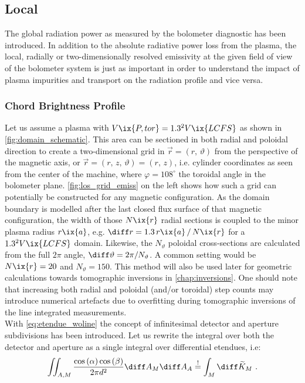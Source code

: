         \subsection{Local}\label{subsec:local}%
%
            The global radiation power as measured by the bolometer diagnostic has been introduced. In addition to the absolute radiative power loss from the plasma, the local, radially or two-dimensionally resolved emissivity at the given field of view of the bolometer system is just as important in order to understand the impact of plasma impurities and transport on the radiation profile and vice versa.%
%
            \subsubsection*{Chord Brightness Profile}%
%
                Let us assume a plasma with $V\ix{P, tor}=1.3^{2}V\ix{LCFS}$ as shown in \cref{fig:domain_schematic}. This area can be sectioned in both radial and poloidal direction to create a two-dimensional grid in $\vec{r}=\left(r,\,\vartheta\right)$ from the perspective of the magnetic axis, or $\vec{r}=\left(r,\,z,\,\vartheta\right)=\left(r,\,z\right)$, i.e. cylinder coordinates as seen from the center of the machine, where $\varphi=108^{\circ}$ the toroidal angle in the bolometer plane. \autoref{fig:los_grid_emiss} on the left shows how such a grid can potentially be constructed for any magnetic configuration. As the domain boundary is modelled after the last closed flux surface of that magnetic configuration, the width of those $N\ix{r}$ radial sections is coupled to the minor plasma radius $r\ix{a}$, e.g. $\diff r=1.3\,r\ix{a}\,/\,N\ix{r}$ for a $1.3^{2}V\ix{LCFS}$ domain. Likewise, the $N_{\vartheta}$ poloidal cross-sections are calculated from the full $2\pi$ angle, $\diff\vartheta=2\pi/N_{\vartheta}$. A common setting would be $N\ix{r}=20$ and $N_{\vartheta}=150$. This method will also be used later for geometric calculations towards tomographic inversions in \cref{chap:inversions}. One should note that increasing both radial and poloidal (and/or toroidal) step counts may introduce numerical artefacts due to overfitting during tomographic inversions of the line integrated measurements.\\%
                With \cref{eq:etendue_woline} the concept of infinitesimal detector and aperture subdivisions has been introduced. Let us rewrite the integral over both the detector and aperture as a single integral over differential etendues, i.e:%
%
                \begin{align}%
                    \iint_{A, M}\frac{\cos\left(\alpha\right)\cos\left(\beta\right)}{2\pi d^{2}}\diff A_{M}\diff A_{A}\overset{!}{=}\int_{M}\diff \widetilde{K}_{M}\,\,.\label{eq:diff_etendues}%
                \end{align}%
